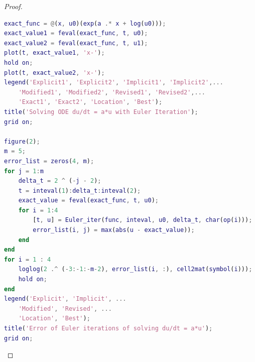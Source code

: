 \documentclass{article}
\begin{document}
\begin{proof}
\begin{lstlisting}[language = {MATLAB}]
exact_func = @(x, u0)(exp(a .* x + log(u0)));
exact_value1 = feval(exact_func, t, u0);
exact_value2 = feval(exact_func, t, u1);
plot(t, exact_value1, 'x-');
hold on;
plot(t, exact_value2, 'x-');
legend('Explicit1', 'Explicit2', 'Implicit1', 'Implicit2',...
    'Modified1', 'Modified2', 'Revised1', 'Revised2',...
    'Exact1', 'Exact2', 'Location', 'Best');
title('Solving ODE du/dt = a*u with Euler Iteration');
grid on;

figure(2);
m = 5;
error_list = zeros(4, m);
for j = 1:m
    delta_t = 2 ^ (-j - 2);
    t = inteval(1):delta_t:inteval(2);
    exact_value = feval(exact_func, t, u0);
    for i = 1:4
        [t, u] = Euler_iter(func, inteval, u0, delta_t, char(op(i)));
        error_list(i, j) = max(abs(u - exact_value));
    end
end
for i = 1 : 4
    loglog(2 .^ (-3:-1:-m-2), error_list(i, :), cell2mat(symbol(i)));
    hold on;
end
legend('Explicit', 'Implicit', ...
    'Modified', 'Revised', ...
    'Location', 'Best');
title('Error of Euler iterations of solving du/dt = a*u');
grid on;
\end{lstlisting}


\end{proof}
\end{document}
